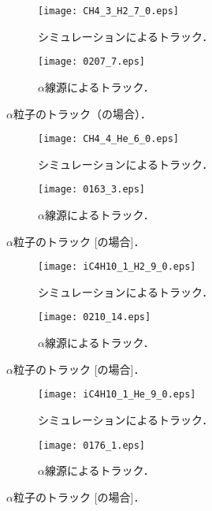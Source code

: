 \documentclass[../master]{subfiles}
\begin{document}
\begin{figure}
  \centering
  \begin{subfigure}{0.48\columnwidth}
    \centering
    \texttt{[image: CH4\_3\_H2\_7\_0.eps]}
    \caption{シミュレーションによるトラック．}
  \end{subfigure}
  \begin{subfigure}{0.48\columnwidth}
    \centering
    \texttt{[image: 0207\_7.eps]}
    \caption{$\alpha$線源によるトラック．}
  \end{subfigure}
  \caption{$\alpha$粒子のトラック（\MethaneHydro の場合）．}
  \label{fig::track_comp_ch4_h2}
\end{figure}

\begin{figure}
  \centering
  \begin{subfigure}{0.48\columnwidth}
    \centering
    \texttt{[image: CH4\_4\_He\_6\_0.eps]}
    \caption{シミュレーションによるトラック．}
  \end{subfigure}
  \begin{subfigure}{0.48\columnwidth}
    \centering
    \texttt{[image: 0163\_3.eps]}
    \caption{$\alpha$線源によるトラック．}
  \end{subfigure}
  \caption{$\alpha$粒子のトラック [\MethaneHerium の場合]．}
  \label{fig::track_comp_ch4_he}
\end{figure}

\begin{figure}
  \centering
  \begin{subfigure}{0.48\columnwidth}
    \centering
    \texttt{[image: iC4H10\_1\_H2\_9\_0.eps]}
    \caption{シミュレーションによるトラック．}
  \end{subfigure}
  \begin{subfigure}{0.48\columnwidth}
    \centering
    \texttt{[image: 0210\_14.eps]}
    \caption{$\alpha$線源によるトラック．}
  \end{subfigure}
  \caption{$\alpha$粒子のトラック [\isoButaneHydro の場合]．}
  \label{fig::track_comp_ic4h10_h2}
\end{figure}

\begin{figure}
  \centering
  \begin{subfigure}{0.48\columnwidth}
    \centering
    \texttt{[image: iC4H10\_1\_He\_9\_0.eps]}
    \caption{シミュレーションによるトラック．}
  \end{subfigure}
  \begin{subfigure}{0.48\columnwidth}
    \centering
    \texttt{[image: 0176\_1.eps]}
    \caption{$\alpha$線源によるトラック．}
  \end{subfigure}
  \caption{$\alpha$粒子のトラック [\isoButaneHerium の場合]．}
  \label{fig::track_comp_ic4h10_he}
\end{figure}
\end{document}
